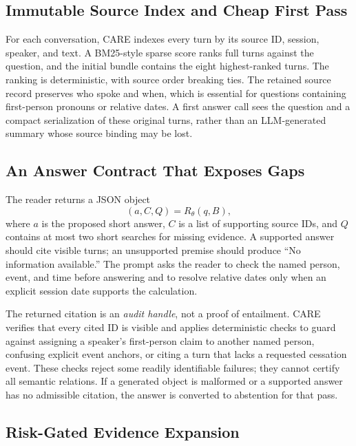 \documentclass[11pt]{article}
\newcommand{\care}{\textsc{CARE}}
\begin{document}
\subsection{Immutable Source Index and Cheap First Pass}

For each conversation, \care{} indexes every turn by its source ID, session,
speaker, and text. A BM25-style sparse score ranks full turns against the
question, and the initial bundle contains the eight highest-ranked turns.
The ranking is deterministic, with source order breaking ties. The retained
source record preserves who spoke and when, which is essential for questions
containing first-person pronouns or relative dates. A first answer call sees
the question and a compact serialization of these original turns, rather
than an LLM-generated summary whose source binding may be lost.

\subsection{An Answer Contract That Exposes Gaps}

The reader returns a JSON object
\begin{equation}
(a,C,Q)=R_{\theta}(q,B),
\label{eq:reader}
\end{equation}
where $a$ is the proposed short answer, $C$ is a list of supporting source
IDs, and $Q$ contains at most two short searches for missing evidence. A
supported answer should cite visible turns; an unsupported premise should
produce ``No information available.'' The prompt asks the reader to check
the named person, event, and time before answering and to resolve relative
dates only when an explicit session date supports the calculation.

The returned citation is an \emph{audit handle}, not a proof of entailment.
\care{} verifies that every cited ID is visible and applies deterministic
checks to guard against assigning a speaker's first-person claim to another
named person, confusing explicit event anchors, or citing a turn that lacks
a requested cessation event. These checks reject some readily identifiable
failures; they cannot certify all semantic relations. If a generated object
is malformed or a supported answer has no admissible citation, the answer
is converted to abstention for that pass.

\subsection{Risk-Gated Evidence Expansion}
\end{document}

